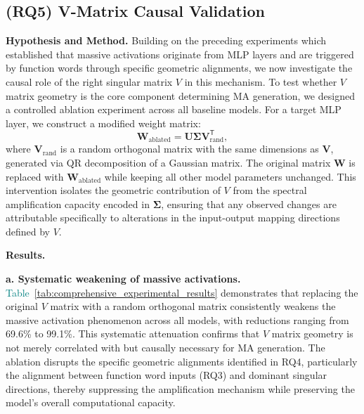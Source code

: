 \documentclass[conference]{IEEEtran}
\begin{document}
\vspace{0.5em}
\noindent{}
\vspace{0.5em}

\subsection{(RQ5) V-Matrix Causal Validation}
\label{sec:RQ5}

\noindent\textbf{Hypothesis and Method.}
Building on the preceding experiments which established that massive activations originate from MLP layers and are triggered by function words through specific geometric alignments, we now investigate the causal role of the right singular matrix $V$ in this mechanism. To test whether $V$ matrix geometry is the core component determining MA generation, we designed a controlled ablation experiment across all baseline models. For a target MLP layer, we construct a modified weight matrix:
\begin{equation}
\mathbf{W}_{\text{ablated}} = \mathbf{U}\boldsymbol{\Sigma}\mathbf{V}_{\text{rand}}^{\mathsf{T}},
\end{equation}
where $\mathbf{V}_{\text{rand}}$ is a random orthogonal matrix with the same dimensions as $\mathbf{V}$, generated via QR decomposition of a Gaussian matrix. The original matrix $\mathbf{W}$ is replaced with $\mathbf{W}_{\text{ablated}}$ while keeping all other model parameters unchanged. This intervention isolates the geometric contribution of $V$ from the spectral amplification capacity encoded in $\boldsymbol{\Sigma}$, ensuring that any observed changes are attributable specifically to alterations in the input-output mapping directions defined by $V$.

\smallskip
\noindent\textbf{Results.}

\smallskip
\noindent\textbf{a. Systematic weakening of massive activations.}
\textcolor{teal}{Table~\ref{tab:comprehensive_experimental_results}} demonstrates that replacing the original $V$ matrix with a random orthogonal matrix consistently weakens the massive activation phenomenon across all models, with reductions ranging from 69.6\% to 99.1\%. This systematic attenuation confirms that $V$ matrix geometry is not merely correlated with but causally necessary for MA generation. The ablation disrupts the specific geometric alignments identified in RQ4, particularly the alignment between function word inputs (RQ3) and dominant singular directions, thereby suppressing the amplification mechanism while preserving the model's overall computational capacity.
\end{document}

